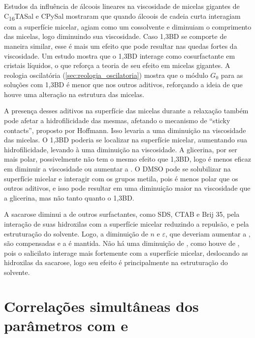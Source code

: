 		Estudos da influência de álcoois lineares na viscosidade de micelas gigantes de C\textsubscript{16}TASal e CPySal mostraram que quando álcoois de cadeia curta interagiam com a superfície micelar, agiam como um cossolvente e diminuiam o comprimento das micelas, logo diminuindo sua viscosidade. Caso 1,3BD se comporte de maneira similar, esse é mais um efeito que pode resultar nas quedas fortes da viscosidade. Um estudo mostra que o 1,3BD interage como cosurfactante em cristais líquidos, o que reforça a teoria de seu efeito em micelas gigantes. A reologia oscilatória (\autoref{sec:reologia_oscilatoria}) mostra que o módulo \(G_0\) para as soluções com 1,3BD é menor que nos outros aditivos, reforçando a ideia de que houve uma alteração na estrutura das micelas.
		
		A presença desses aditivos na superfície das micelas durante a relaxação também pode afetar a hidrofilicidade das mesmas, afetando o mecanismo de ``sticky contacts'', proposto por Hoffmann. Isso levaria a uma diminuição na viscosidade das micelas. O 1,3BD poderia se localizar na superfície micelar, aumentando sua hidrofilicidade, levando à uma diminuição na viscosidade. A glicerina, por ser mais polar, possivelmente não tem o mesmo efeito que 1,3BD, logo é menos eficaz em diminuir a viscosidade ou aumentar a \cmc. O DMSO pode se solubilizar na superfície micelar e interagir com os grupos metila, pois é menos polar que os outros aditivos, e isso pode resultar em uma diminuição maior na viscosidade que a glicerina, mas não tanto quanto o 1,3BD. 
		
		
		A sacarose diminui a \cmc{} de outros surfactantes, como SDS, CTAB e Brij 35, pela interação de suas hidroxilas com a superfície micelar reduzindo a repulsão, e pela estruturação do solvente. Logo, a diminuição de \(n\) e \(\varepsilon\), que deveriam aumentar a \cwlm{}, são compensadas e a \cwlm{} é mantida. Não há uma diminuição de \cwlm, como houve de \cmc, pois o salicilato interage mais fortemente com a superfície micelar, deslocando as hidroxilas da sacarose, logo seu efeito é principalmente na estruturação do solvente.
		
		\section{Correlações simultâneas dos parâmetros com \cmc{} e \DHmic}
		
